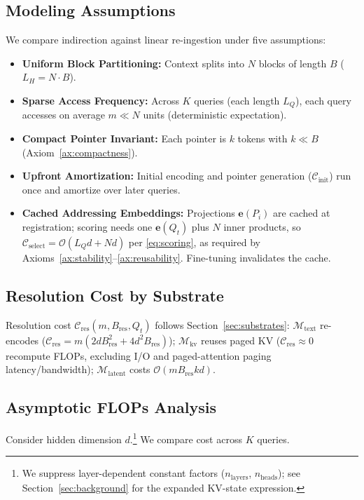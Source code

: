 \documentclass[runningheads]{llncs}
\begin{document}
{\subsection{Modeling Assumptions}
We compare indirection against linear re-ingestion under five assumptions:
\begin{itemize}\setlength{\itemsep}{0.5pt}\setlength{\parsep}{0pt}\setlength{\topsep}{1pt}
    \item[\textbf{A1.}] \textbf{Uniform Block Partitioning:} Context splits into $N$ blocks of length $B$ ($L_H = N \cdot B$).
    \item[\textbf{A2.}] \textbf{Sparse Access Frequency:} Across $K$ queries (each length $L_Q$), each query accesses on average $m \ll N$ units (deterministic expectation).
    \item[\textbf{A3.}] \textbf{Compact Pointer Invariant:} Each pointer is $k$ tokens with $k \ll B$ (Axiom~\ref{ax:compactness}).
    \item[\textbf{A4.}] \textbf{Upfront Amortization:} Initial encoding and pointer generation ($\mathcal{C}_{\text{init}}$) run once and amortize over later queries.
    \item[\textbf{A5.}] \textbf{Cached Addressing Embeddings:} Projections $\mathbf{e}(P_i)$ are cached at registration; scoring needs one $\mathbf{e}(Q_t)$ plus $N$ inner products, so $\mathcal{C}_{\mathrm{select}}=\mathcal{O}(L_Q d + Nd)$ per \eqref{eq:scoring}, as required by Axioms~\ref{ax:stability}--\ref{ax:reusability}. Fine-tuning invalidates the cache.
\end{itemize}

\subsection{Resolution Cost by Substrate}
Resolution cost $\mathcal{C}_{\mathrm{res}}(m,B_{\mathrm{res}},Q_t)$ follows Section~\ref{sec:substrates}: $\mathcal{M}_{\mathrm{text}}$ re-encodes ($\mathcal{C}_{\mathrm{res}} = m(2dB_{\mathrm{res}}^2 + 4d^2B_{\mathrm{res}})$); $\mathcal{M}_{\mathrm{kv}}$ reuses paged KV ($\mathcal{C}_{\mathrm{res}} \approx 0$ recompute FLOPs, excluding I/O and paged-attention paging latency/bandwidth); $\mathcal{M}_{\mathrm{latent}}$ costs $\mathcal{O}(m B_{\mathrm{res}} k d)$.

\subsection{Asymptotic FLOPs Analysis}
Consider hidden dimension $d$.\footnote{We suppress layer-dependent constant factors ($n_{\text{layers}}$, $n_{\text{heads}}$); see Section~\ref{sec:background} for the expanded KV-state expression.} We compare cost across $K$ queries.

}
\end{document}
